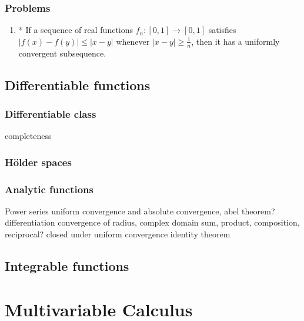 \documentclass{../../large}
\begin{document}
\section*{Problems}
\begin{enumerate}
\item* If a sequence of real functions $f_n\colon[0,1]\to[0,1]$ satisfies $|f(x)-f(y)|\le|x-y|$ whenever $|x-y|\ge\frac1n$, then it has a uniformly convergent subsequence.
\end{enumerate}

\chapter{Differentiable functions}
\section{Differentiable class}
completeness
\section{H\"older spaces}

\section{Analytic functions}

Power series
uniform convergence and absolute convergence, abel theorem?
differentiation
convergence of radius, complex domain
sum, product, composition, reciprocal?
closed under uniform convergence
identity theorem






\chapter{Integrable functions}
\section{}

\begin{prb}
\end{prb}













\part{Multivariable Calculus}
\end{document}
